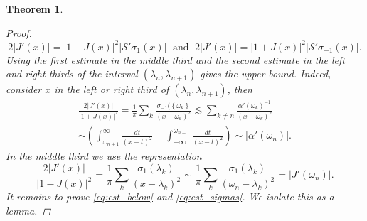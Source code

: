 \documentclass{article}[12pt]
\newtheorem{theorem}{Theorem}
\theoremstyle{remark}
\begin{document}
\begin{theorem}
\begin{proof}
\begin{equation*}
                2\lvert J'(x) \rvert = \lvert1-J(x)\rvert^{2}\lvert \mathcal{S}'\sigma_{1}(x)\rvert \; \text{ and } \; 2\lvert J'(x) \rvert = \lvert1+J(x)\rvert^{2}\lvert\mathcal{S}'\sigma_{-1}(x)\rvert.
            \end{equation*}
            Using the first estimate in the middle third and the second estimate in the left and right thirds of the interval $(\lambda_{n}, \lambda_{n+1})$ gives the upper bound. Indeed, consider $x$ in the left or right third of $(\lambda_{n},\lambda_{n+1})$, then
            \begin{equation*}
                \begin{split}
                    \frac{2\lvert J'(x)\rvert}{\lvert1+J(x)\rvert^{2}} = \frac{1}{\pi}\sum_{k} \frac{\sigma_{-1}(\left\{ \omega_{k} \right\}}{(x-\omega_{k})^{2}} \lesssim \sum_{k\neq n} \frac{\alpha'(\omega_{k})^{-1}}{(x-\omega_{k})^{2}} \\ \sim \left( \int_{\omega_{n+1}}^{\infty}\frac{dt}{(x-t)^{2}} + \int_{-\infty}^{\omega_{n-1}}\frac{dt}{(x-t)^{2}}\right) \sim \lvert \alpha'(\omega_{n}) \rvert.
                \end{split}
            \end{equation*}
            In the middle third we use the representation
            \begin{equation*}
                \frac{2\lvert J'(x) \rvert}{\lvert1-J(x)\rvert^{2}} = \frac{1}{\pi} \sum_{k} \frac{\sigma_{1}(\lambda_{k})}{(x-\lambda_{k})^{2}} \sim \frac{1}{\pi}\sum_{k} \frac{\sigma_{1}(\lambda_{k})}{(\omega_{n}-\lambda_{k})^{2}} = \lvert J'(\omega_{n})\rvert.
            \end{equation*}
            It remains to prove \eqref{eq:est_below} and \eqref{eq:est_sigmas}. We isolate this as a lemma.
            \end{proof}
        \end{theorem}
\end{document}
